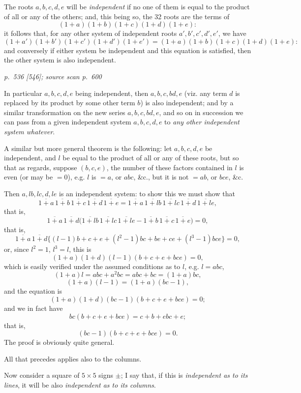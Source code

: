 \documentclass[11pt,a4paper]{article}
\newcommand{\sourcepage}[3]{%
  \bigskip
  \noindent\textit{p.~#1 [#2]; source scan p.~#3}%
  \par\smallskip
}
\newcommand{\oproduct}[1]{\overline{#1}}
\begin{document}
The roots $a,b,c,d,e$ will be \textit{independent} if no one of them is equal
to the product of all or any of the others; and, this being so, the 32 roots
are the terms of
\[
(1+a)(1+b)(1+c)(1+d)(1+e):
\]
it follows that, for any other system of independent roots
$a',b',c',d',e'$, we have
\[
(1+a')(1+b')(1+c')(1+d')(1+e')
=(1+a)(1+b)(1+c)(1+d)(1+e):
\]
and conversely if either system be independent and this equation is
satisfied, then the other system is also independent.

\clearpage

\sourcepage{536}{546}{600}

In particular $a,b,c,d,e$ being independent, then $a,b,c,bd,e$ (viz. any
term $d$ is replaced by its product by some other term $b$) is also
independent; and by a similar transformation on the new series
$a,b,c,bd,e$, and so on in succession we can pass from a given independent
system $a,b,c,d,e$ to \textit{any other independent system whatever}.

A similar but more general theorem is the following: let $a,b,c,d,e$ be
independent, and $l$ be equal to the product of all or any of these roots,
but so that as regards, suppose $(b,c,e)$, the number of these factors
contained in $l$ is even (or may be $=0$), e.g. $l$ is $=a$, or $abc$, \&c.,
but it is not $=ab$, or $bce$, \&c.

Then $a,lb,lc,d,le$ is an independent system: to show this we must show that
\[
\oproduct{1+a}\,\oproduct{1+b}\,\oproduct{1+c}\,\oproduct{1+d}\,
\oproduct{1+e}
=
\oproduct{1+a}\,\oproduct{1+lb}\,\oproduct{1+lc}\,\oproduct{1+d}\,
\oproduct{1+le},
\]
that is,
\[
\oproduct{1+a}\,\oproduct{1+d}
\bigl(\oproduct{1+lb}\,\oproduct{1+lc}\,\oproduct{1+le}
-\oproduct{1+b}\,\oproduct{1+c}\,\oproduct{1+e}\bigr)=0,
\]
that is,
\[
\oproduct{1+a}\,\oproduct{1+d}
\{(l-1)b+c+e+(l^{2}-1)bc+be+ce+(l^{3}-1)bce\}=0,
\]
or, since $l^{2}=1$, $l^{3}=l$, this is
\[
(1+a)(1+d)(l-1)(b+c+e+bce)=0,
\]
which is easily verified under the assumed conditions as to $l$, e.g.
$l=abc$,
\[
(1+a)l=abc+a^{2}bc=abc+bc=(1+a)bc,
\]
\[
(1+a)(l-1)=(1+a)(bc-1),
\]
and the equation is
\[
(1+a)(1+d)(bc-1)(b+c+e+bce)=0;
\]
and we in fact have
\[
bc(b+c+e+bce)=c+b+ebc+e;
\]
that is,
\[
(bc-1)(b+c+e+bce)=0.
\]
The proof is obviously quite general.

All that precedes applies also to the columns.

Now consider a square of $5\times5$ signs $\pm$; I say that, if this is
\textit{independent as to its lines}, it will be also \textit{independent as
to its columns}.
\end{document}
